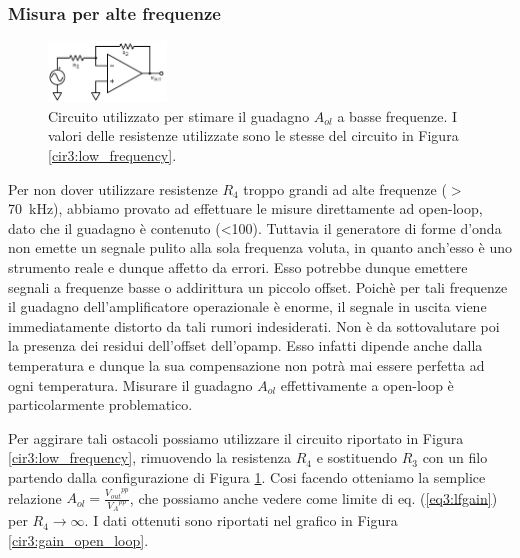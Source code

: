\subsubsection*{Misura per alte frequenze}

\begin{figure}
  \begin{center}
    \includegraphics[width=0.28\textwidth]{../E03/latex/HF_ol.pdf}
  \end{center}
  \caption{Circuito utilizzato per stimare il guadagno $A_{ol}$ a basse frequenze. I valori delle resistenze utilizzate sono le stesse del circuito in Figura \ref{cir3:low_frequency}.}
  \label{cir3:high_frequency}
\end{figure}

Per non dover utilizzare resistenze $R_4$ troppo grandi ad alte frequenze ($>$ \SI{70}{\kilo\hertz}), abbiamo provato ad effettuare le misure direttamente ad open-loop, dato che il guadagno è contenuto (\num{<100}).
Tuttavia il generatore di forme d'onda non emette un segnale pulito alla sola frequenza voluta, in quanto anch'esso è uno strumento reale e dunque affetto da errori.
Esso potrebbe dunque emettere segnali a frequenze basse o addirittura un piccolo offset.
Poichè per tali frequenze il guadagno dell'amplificatore operazionale è enorme, il segnale in uscita viene immediatamente distorto da tali rumori indesiderati.
Non è da sottovalutare poi la presenza dei residui dell'offset dell'opamp.
Esso infatti dipende anche dalla temperatura e dunque la sua compensazione non potrà mai essere perfetta ad ogni temperatura.
Misurare il guadagno $A_{ol}$ effettivamente a open-loop è particolarmente problematico.

Per aggirare tali ostacoli possiamo utilizzare il circuito riportato in Figura \ref{cir3:low_frequency}, rimuovendo la resistenza $R_4$ e sostituendo $R_3$ con un filo partendo dalla configurazione di Figura \ref{cir3:high_frequency}.
Cosi facendo otteniamo la semplice relazione $A_{ol}=\frac{{V_{out}}^{pp}}{{V_A}^{pp}}$, che possiamo anche vedere come limite di eq. (\ref{eq3:lfgain}) per $R_4 \rightarrow \infty$.
I dati ottenuti sono riportati nel grafico in Figura \ref{cir3:gain_open_loop}.

